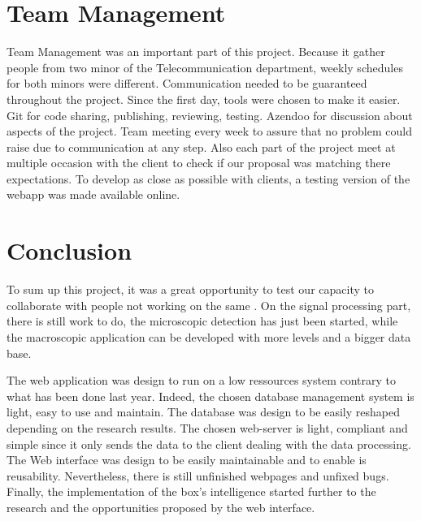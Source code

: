 %
%
\section{Team Management}

Team Management was an important part of this project. Because it gather people from two minor of the Telecommunication department, weekly schedules for both minors were different. Communication needed to be guaranteed throughout the project. Since the first day, tools were chosen to make it easier. Git for code sharing, publishing, reviewing, testing. Azendoo for discussion about aspects of the project. Team meeting every week to assure that no problem could raise due to communication at any step. Also each part of the project meet at multiple occasion with the client to check if our proposal was matching there expectations. To develop as close as possible with clients, a testing version of the webapp was made available online.\\

\section{Conclusion}

To sum up this project, it was a great opportunity to test our capacity to collaborate with people not working on the same . On the signal processing part, there is still work to do, the microscopic detection has just been started, while the macroscopic application can be developed with more levels and a bigger data base.

%
%
%

The web application was design to run on a low ressources system contrary to what has been done last year. Indeed, the chosen database management system is light, easy to use and maintain. The database was design to be easily reshaped depending on the research results. The chosen web-server is light, compliant and simple since it only sends the data to the client dealing with the data processing. The Web interface was design to be easily maintainable and to enable is reusability. Nevertheless, there is still unfinished webpages and unfixed bugs. Finally, the implementation of the box's intelligence started further to the research and the opportunities proposed by the web interface.
